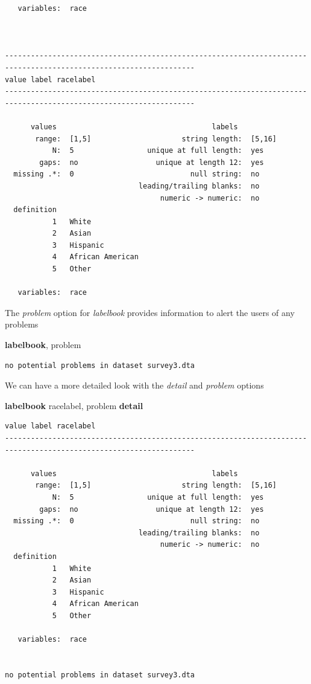 \documentclass[
]{book}
\newenvironment{Shaded}{\begin{snugshade}}{\end{snugshade}}
\newcommand{\KeywordTok}[1]{\textcolor[rgb]{0.13,0.29,0.53}{\textbf{#1}}}
\newcommand{\NormalTok}[1]{#1}
\begin{document}
\begin{verbatim}
   variables:  race



------------------------------------------------------------------------------------------------------------------
value label racelabel 
------------------------------------------------------------------------------------------------------------------

      values                                    labels
       range:  [1,5]                     string length:  [5,16]
           N:  5                 unique at full length:  yes
        gaps:  no                  unique at length 12:  yes
  missing .*:  0                           null string:  no
                               leading/trailing blanks:  no
                                    numeric -> numeric:  no
  definition
           1   White
           2   Asian
           3   Hispanic
           4   African American
           5   Other

   variables:  race
\end{verbatim}

The \emph{problem} option for \emph{labelbook} provides information to alert the users of any problems

\begin{Shaded}
\begin{Highlighting}[]
\KeywordTok{labelbook}\NormalTok{, problem}
\end{Highlighting}
\end{Shaded}

\begin{verbatim}
no potential problems in dataset survey3.dta
\end{verbatim}

We can have a more detailed look with the \emph{detail} and \emph{problem} options

\begin{Shaded}
\begin{Highlighting}[]
\KeywordTok{labelbook}\NormalTok{ racelabel, problem }\KeywordTok{detail}
\end{Highlighting}
\end{Shaded}

\begin{verbatim}
value label racelabel 
------------------------------------------------------------------------------------------------------------------

      values                                    labels
       range:  [1,5]                     string length:  [5,16]
           N:  5                 unique at full length:  yes
        gaps:  no                  unique at length 12:  yes
  missing .*:  0                           null string:  no
                               leading/trailing blanks:  no
                                    numeric -> numeric:  no
  definition
           1   White
           2   Asian
           3   Hispanic
           4   African American
           5   Other

   variables:  race


no potential problems in dataset survey3.dta
\end{verbatim}
\end{document}
